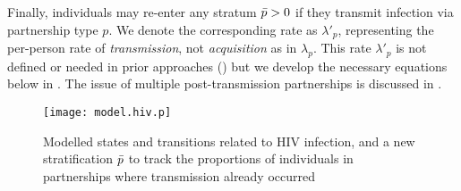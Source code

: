 Finally, individuals may re-enter any stratum $\bar{p} > 0$
if they transmit infection via partnership type $p$.
We denote the corresponding rate as $\lambda'_{p}$,
representing the per-person rate of \emph{transmission},
not \emph{acquisition} as in $\lambda_{p}$.
This rate $\lambda'_{p}$ is not defined or needed in prior approaches ()
but we develop the necessary equations below in .
The issue of multiple post-transmission partnerships is discussed in . %
\begin{figure}
  \centering\texttt{[image: model.hiv.p]}
  \caption{Modelled states and transitions related to HIV infection,
    and a new stratification $\bar{p}$ to track
    the proportions of individuals in partnerships where transmission already occurred}
  \label{fig:model.hiv.p}
\end{figure}
